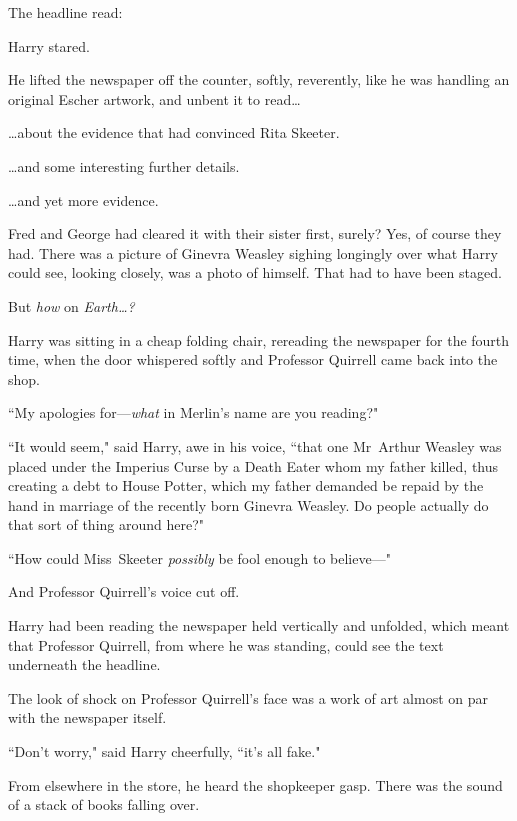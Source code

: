 The headline read:


Harry stared.

He lifted the newspaper off the counter, softly, reverently, like he was handling an original Escher artwork, and unbent it to read{\ldots}

{\ldots}about the evidence that had convinced Rita Skeeter.

{\ldots}and some interesting further details.

{\ldots}and yet more evidence.

Fred and George had cleared it with their sister first, surely? Yes, of course they had. There was a picture of Ginevra Weasley sighing longingly over what Harry could see, looking closely, was a photo of himself. That had to have been staged.

But \emph{how} on \emph{Earth{\ldots}?}

Harry was sitting in a cheap folding chair, rereading the newspaper for the fourth time, when the door whispered softly and Professor Quirrell came back into the shop.

``My apologies for—\emph{what} in Merlin's name are you reading?"

``It would seem," said Harry, awe in his voice, ``that one Mr~Arthur Weasley was placed under the Imperius Curse by a Death Eater whom my father killed, thus creating a debt to House Potter, which my father demanded be repaid by the hand in marriage of the recently born Ginevra Weasley. Do people actually do that sort of thing around here?"

``How could Miss~Skeeter \emph{possibly} be fool enough to believe—"

And Professor Quirrell's voice cut off.

Harry had been reading the newspaper held vertically and unfolded, which meant that Professor Quirrell, from where he was standing, could see the text underneath the headline.

The look of shock on Professor Quirrell's face was a work of art almost on par with the newspaper itself.

``Don't worry," said Harry cheerfully, ``it's all fake."

From elsewhere in the store, he heard the shopkeeper gasp. There was the sound of a stack of books falling over.

